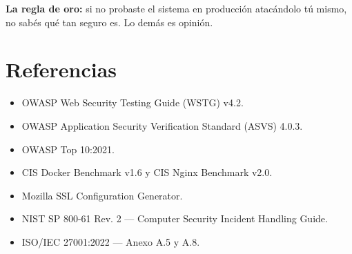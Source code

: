 \documentclass[12pt,a4paper,oneside]{article}
\begin{document}
\textbf{La regla de oro:} si no probaste el sistema en producción atacándolo tú mismo, no sabés qué tan seguro es. Lo demás es opinión.

\section*{Referencias}
\begin{itemize}[leftmargin=*]
  \item OWASP Web Security Testing Guide (WSTG) v4.2.
  \item OWASP Application Security Verification Standard (ASVS) 4.0.3.
  \item OWASP Top 10:2021.
  \item CIS Docker Benchmark v1.6 y CIS Nginx Benchmark v2.0.
  \item Mozilla SSL Configuration Generator.
  \item NIST SP 800-61 Rev. 2 — Computer Security Incident Handling Guide.
  \item ISO/IEC 27001:2022 — Anexo A.5 y A.8.
\end{itemize}
\end{document}
